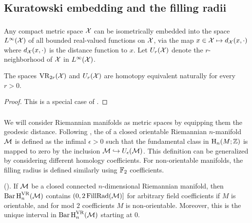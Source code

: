 

\subsection{Kuratowski embedding and the filling radii}
\label{sub:filling radii}

\subsubsection{}\label{ss:kuratowski}

Any compact metric space $\mathcal{X}$ can be isometrically embedded into the space $L^\infty(\mathcal{X})$ of all bounded real-valued functions on $\mathcal{X}$, via the map $x \in \mathcal{X} \mapsto d_{\mathcal{X}}(x,\cdot)$ where $d_{\mathcal{X}}(x,\cdot)$ is the distance function to $x$.
Let $U_r(\mathcal{X})$ denote the $r$-neighborhood of $\mathcal{X}$ in $L^\infty(\mathcal{X})$.

\medskip\lemma The spaces $\operatorname{VR}_{2r}(\mathcal{X})$ and $U_r(\mathcal{X})$ are homotopy equivalent naturally for every \(r > 0\).

\begin{proof}
	This is a special case of \cite[Theorem.4.1]{lim2020vietoris}.
\end{proof}

\subsubsection{}\label{ss:filling_radius}

We will consider Riemannian manifolds as metric spaces by equipping them the geodesic distance.
Following \cite{gromov1983filling}, the  of a closed orientable Riemannian $n$-manifold $\mathcal{M}$ is defined as the infimal $\epsilon > 0$ such that the fundamental class in $\mathrm{H}_n(M; \mathbb{Z})$ is mapped to zero by the inclusion $\mathcal{M} \hookrightarrow U_\epsilon(\mathcal{M})$.
This definition can be generalized by considering different homology coefficients. 
For non-orientable manifolds, the filling radius is defined similarly using \({\mathbb{F}_2}\) coefficients.

\medskip\lemma(\cite[Prop.9.28]{lim2020vietoris}). If $\mathcal{M}$ be a closed connected $n$-dimensional Riemannian manifold, then \(\operatorname{Bar} \operatorname{H}_{n}^{\operatorname{VR}} (\mathcal{M})\) contains \((0,2\operatorname{FillRad}(\mathcal{M})]\) for arbitrary field coefficients if $M$ is orientable, and for mod $2$ coefficients $M$ is non-orientable.
Moreover, this is the unique interval in \(\operatorname{Bar} \operatorname{H}_{n}^{\operatorname{VR}} (\mathcal{M})\) starting at $0$.

